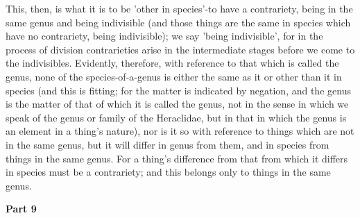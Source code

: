 This, then, is what it is to be 'other in species'-to have a contrariety, being in the same genus and being indivisible (and those things are the same in species which have no contrariety, being indivisible); we say 'being indivisible', for in the process of division contrarieties arise in the intermediate stages before we come to the indivisibles. Evidently, therefore, with reference to that which is called the genus, none of the species-of-a-genus is either the same as it or other than it in species (and this is fitting; for the matter is indicated by negation, and the genus is the matter of that of which it is called the genus, not in the sense in which we speak of the genus or family of the Heraclidae, but in that in which the genus is an element in a thing's nature), nor is it so with reference to things which are not in the same genus, but it will differ in genus from them, and in species from things in the same genus. For a thing's difference from that from which it differs in species must be a contrariety; and this belongs only to things in the same genus.

\textbf{Part 9}

